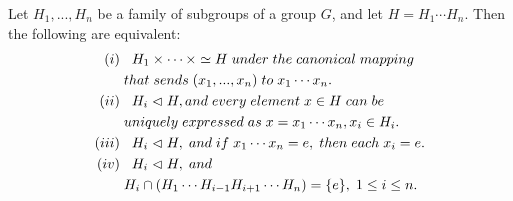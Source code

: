 \begin{teo}
Let $H_1,...,H_n$ be a family of subgroups of a group $G$, and let $H=H_1 \cdots H_n$. Then the following are equivalent:
\begin{align*}
    (i)&\hspace{.3cm}H_1\times\cdots\times\simeq H\hspace{.1cm}under\hspace{.1cm}the\hspace{.1cm}canonical\hspace{.1cm}mapping\\
    &\hspace{.1cm}that\hspace{.1cm}sends\hspace{.1cm}(x_1,...,x_n)\hspace{.1cm}to\hspace{.1cm}x_1\cdots x_n.\\
    (ii)&\hspace{.3cm}H_i\vartriangleleft H, and\hspace{.1cm} every \hspace{.1cm}element\hspace{.1cm} x\in H\hspace{.1cm}can\hspace{.1cm}be\\
    &\hspace{.1cm}uniquely\hspace{.1cm}expressed\hspace{.1cm}as\hspace{.1cm}x=x_1\cdots x_n,x_i\in H_i.\\
    (iii)&\hspace{.3cm}H_i\vartriangleleft H,\hspace{.1cm}and\hspace{.1cm}if\hspace{.1cm}x_1\cdots x_n=e,\hspace{.1cm}then
    \hspace{.1cm}each\hspace{.1cm}x_i=e.\\
    (iv)&\hspace{.3cm}H_i\vartriangleleft H,\hspace{.1cm}and\\
    &\hspace{.1cm}H_i\cap(H_1\cdots H_{i-1}H_{i+1}\cdots H_n)=\{e\},\hspace{.1cm}1\leq i\leq n.
\end{align*}
\end{teo}